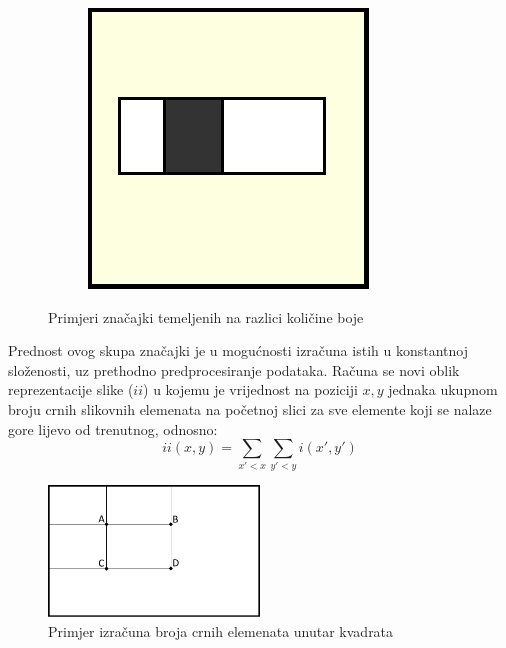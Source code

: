 \documentclass[times, utf8, zavrsni, numeric]{fer}
\begin{document}
\begin{figure}[th!]
\begin{subfigure}{.25\textwidth}
        \captionsetup{justification=centering}
        \caption{}
        \label{fig:haar3}
    \end{subfigure}%
    \begin{subfigure}{.25\textwidth}
        \centering
        \includegraphics[width=.5\linewidth]{Images/Haar_HT.pdf}
        \captionsetup{justification=centering}
        \caption{}
        \label{fig:haar4}
    \end{subfigure}
    \caption{Primjeri značajki temeljenih na razlici količine boje}
    \label{fig:haarFeatures}
\end{figure}

Prednost ovog skupa značajki je u mogućnosti izračuna istih u konstantnoj složenosti, uz prethodno predprocesiranje podataka.
Računa se novi oblik reprezentacije slike ($ii$) u kojemu je vrijednost na poziciji $x, y$ jednaka ukupnom broju crnih slikovnih elemenata na početnoj slici za sve elemente koji se nalaze gore lijevo od trenutnog, odnosno:
\[
    ii(x, y) = 
        \displaystyle \sum_{x' < x} 
        \displaystyle \sum_{y' < y}
        i(x', y')
\]

\begin{figure}[ht!]
    \centering
    \includegraphics[width=0.5\textwidth]{Images/Integral.pdf}
    \captionsetup{justification=centering}
    \caption{Primjer izračuna broja crnih elemenata unutar kvadrata}
    \label{fig:integral}
\end{figure}
\end{document}
